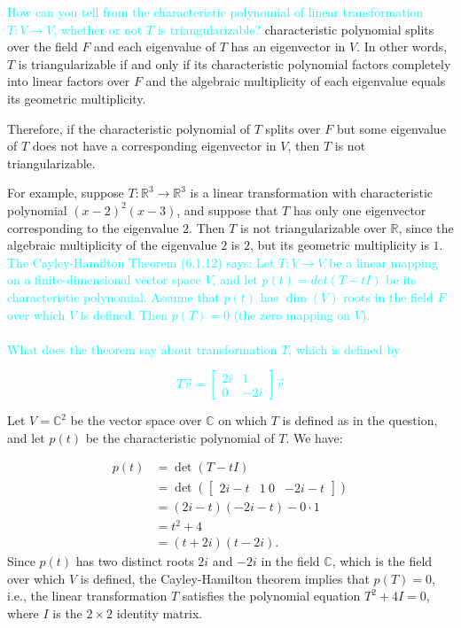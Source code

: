\documentclass[fontsize=12pt]{scrartcl}
\begin{document}
\newpage

\noindent
\textcolor{cyan}{How can you tell from the characteristic polynomial of linear transformation $T:V \to V$, whether or not $T$ is triangularizable?}
\noindent
characteristic polynomial splits over the field $F$ and each eigenvalue of $T$ has an eigenvector in $V$. In other words, $T$ is triangularizable if and only if its characteristic polynomial factors completely into linear factors over $F$ and the algebraic multiplicity of each eigenvalue equals its geometric multiplicity.

\noindent
Therefore, if the characteristic polynomial of $T$ splits over $F$ but some eigenvalue of $T$ does not have a corresponding eigenvector in $V$, then $T$ is not triangularizable.

\noindent
For example, suppose $T: \mathbb{R}^3 \to \mathbb{R}^3$ is a linear transformation with characteristic polynomial $(x-2)^2(x-3)$, and suppose that $T$ has only one eigenvector corresponding to the eigenvalue $2$. Then $T$ is not triangularizable over $\mathbb{R}$, since the algebraic multiplicity of the eigenvalue $2$ is $2$, but its geometric multiplicity is $1$.
\\

\noindent
\textcolor{cyan}{The Cayley-Hamilton Theorem (6.1.12) says: Let $T:V \to V$ be a linear mapping on a finite-dimensional vector space $V$, and let $p(t) = det(T - tI)$ be its characteristic polynomial. Assume that $p(t)$ has $\dim(V)$ roots in the field $F$ over which $V$ is defined. Then $p(T) = 0$ (the zero mapping on $V$).}\\
\\
\textcolor{cyan}{What does the theorem say about transformation $T$, which is defined by}

\textcolor{cyan}{$$T \vec{v} = \begin{bmatrix} 2i & 1 \\ 0 & -2i\end{bmatrix} \vec{v}$$}

\noindent
Let $V = \mathbb{C}^2$ be the vector space over $\mathbb{C}$ on which $T$ is defined as in the question, and let $p(t)$ be the characteristic polynomial of $T$. We have:

\begin{align*}
p(t) &= \det(T-tI) \\
&= \det\left(\begin{bmatrix} 2i-t & 1 \ 0 & -2i-t\end{bmatrix}\right) \\
&= (2i-t)(-2i-t)-0\cdot 1 \\
&= t^2 + 4 \\
&= (t+2i)(t-2i).
\end{align*}
\noindent
Since $p(t)$ has two distinct roots $2i$ and $-2i$ in the field $\mathbb{C}$, which is the field over which $V$ is defined, the Cayley-Hamilton theorem implies that $p(T) = 0$, i.e., the linear transformation $T$ satisfies the polynomial equation $T^2 + 4I = 0$, where $I$ is the $2 \times 2$ identity matrix.
\end{document}
